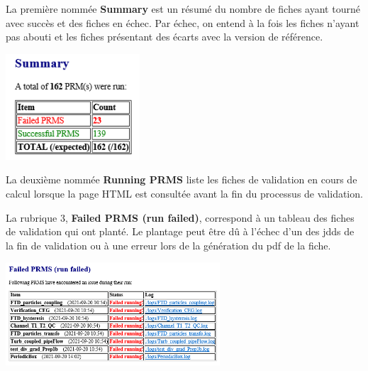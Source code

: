 \begin{minipage}[c]{0.65\linewidth}
La première nommée \textbf{Summary} est un résumé du nombre de fiches ayant tourné avec succès et des fiches en échec. Par échec, on entend à la fois les fiches n'ayant pas abouti et les fiches présentant des écarts avec la version de référence.
\end{minipage} \hfill
\begin{minipage}[c]{0.3\linewidth}
   \includegraphics[width=5cm]{pictures/validation-summary.png}\vspace*{0.2cm}
\end{minipage}
\vspace{0.5cm}

La deuxième nommée \textbf{Running PRMS} liste les fiches de validation en cours de calcul lorsque la page HTML est consultée avant la fin du processus de validation.\vspace{0.6cm}\\


\begin{minipage}[c]{0.5\linewidth}
La rubrique 3, \textbf{Failed PRMS (run failed)}, correspond à un tableau des fiches de validation qui ont planté. Le plantage peut être dû à l'échec d'un des jdds de la fin de validation ou à une erreur lors de la génération du pdf de la fiche.
\end{minipage} \hfill
\begin{minipage}[c]{0.45\linewidth}
   \includegraphics[width=8cm]{pictures/validation-PRMSfailed.png}\vspace*{0.2cm}
\vspace{0.6cm}   
\end{minipage}
\vspace{0.6cm}

